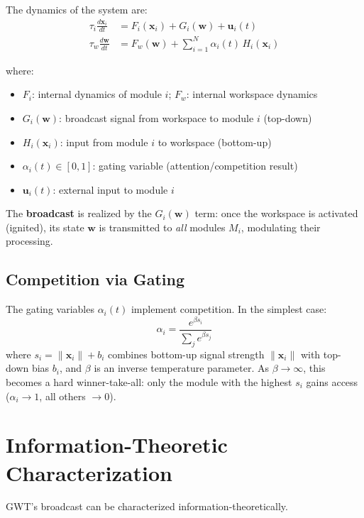\documentclass[11pt,a4paper]{report}
\begin{document}
\begin{definitionbox}
The dynamics of the system are:
\begin{align}
  \tau_i \frac{d\mathbf{x}_i}{dt} &= F_i(\mathbf{x}_i) + G_i(\mathbf{w}) + \mathbf{u}_i(t) \label{eq:module_dyn}\\[6pt]
  \tau_w \frac{d\mathbf{w}}{dt} &= F_w(\mathbf{w}) + \sum_{i=1}^{N} \alpha_i(t)\, H_i(\mathbf{x}_i) \label{eq:workspace_dyn}
\end{align}

where:
\begin{itemize}[leftmargin=1.5em]
  \item $F_i$: internal dynamics of module $i$; \; $F_w$: internal workspace dynamics
  \item $G_i(\mathbf{w})$: broadcast signal from workspace to module $i$ (top-down)
  \item $H_i(\mathbf{x}_i)$: input from module $i$ to workspace (bottom-up)
  \item $\alpha_i(t) \in [0, 1]$: gating variable (attention/competition result)
  \item $\mathbf{u}_i(t)$: external input to module $i$
\end{itemize}
\end{definitionbox}

The \textbf{broadcast} is realized by the $G_i(\mathbf{w})$ term: once the workspace is activated (ignited), its state $\mathbf{w}$ is transmitted to \emph{all} modules $M_i$, modulating their processing.

\subsection{Competition via Gating}

The gating variables $\alpha_i(t)$ implement competition. In the simplest case:
\[
  \alpha_i = \frac{e^{\beta s_i}}{\sum_j e^{\beta s_j}}
\]
where $s_i = \|\mathbf{x}_i\| + b_i$ combines bottom-up signal strength $\|\mathbf{x}_i\|$ with top-down bias $b_i$, and $\beta$ is an inverse temperature parameter. As $\beta \to \infty$, this becomes a hard winner-take-all: only the module with the highest $s_i$ gains access ($\alpha_i \to 1$, all others $\to 0$).

\section{Information-Theoretic Characterization}

GWT's broadcast can be characterized information-theoretically.
\end{document}
